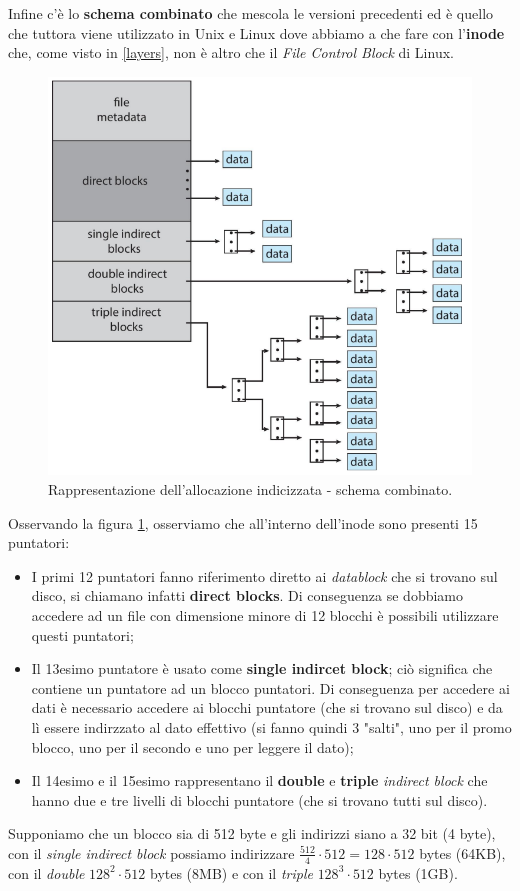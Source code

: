 Infine c'è lo \textbf{schema combinato} che mescola le versioni precedenti ed è quello che tuttora viene utilizzato in Unix e Linux dove abbiamo a che fare con l'\textbf{inode} che, come visto in \ref{layers}, non è altro che il \textit{File Control Block} di Linux.
\begin{figure}[h]
    \centering
    \includegraphics[width = .6\textwidth]{../res/imgs/file system implementation/schema combinato.png}
    \caption{Rappresentazione dell'allocazione indicizzata - schema combinato.}
    \label{fig:schema combinato}
\end{figure}
Osservando la figura \ref{fig:schema combinato}, osserviamo che all'interno dell'inode sono presenti 15 puntatori:
\vspace{-5px}
\begin{itemize}
\setlength{\itemsep}{-.15 em}
    \item I primi 12 puntatori fanno riferimento diretto ai \textit{datablock} che si trovano sul disco, si chiamano infatti \textbf{direct blocks}. Di conseguenza se dobbiamo accedere ad un file con dimensione minore di 12 blocchi è possibili utilizzare questi puntatori;
    \item Il 13esimo puntatore è usato come \textbf{single indircet block}; ciò significa che contiene un puntatore ad un blocco puntatori. Di conseguenza per accedere ai dati è necessario accedere ai blocchi puntatore (che si trovano sul disco) e da lì essere indirzzato al dato effettivo (si fanno quindi 3 "salti", uno per il promo blocco, uno per il secondo e uno per leggere il dato);
    \item Il 14esimo e il 15esimo rappresentano il \textbf{double} e \textbf{triple} \textit{indirect block} che hanno due e tre livelli di blocchi puntatore (che si trovano tutti sul disco).
\end{itemize}
Supponiamo che un blocco sia di 512 byte e gli indirizzi siano a 32 bit (4 byte), con il \textit{single indirect block} possiamo indirizzare $\frac{512}{4}\cdot512 = 128\cdot512$ bytes (64KB), con il \textit{double} $128^2\cdot512$ bytes (8MB) e con il \textit{triple} $128^3\cdot512$ bytes (1GB).

